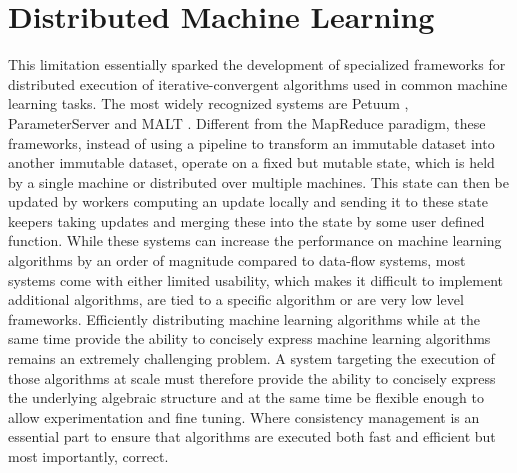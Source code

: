\section{Distributed Machine Learning}
This limitation essentially sparked the development of specialized frameworks for distributed execution of iterative-convergent algorithms used in common machine learning tasks.
The most widely recognized systems are Petuum \cite{Xing2015}, ParameterServer \cite{Li2014} and MALT \cite{Li2015}.
Different from the MapReduce paradigm, these frameworks, instead of using a pipeline to transform an immutable dataset into another immutable dataset, operate on a fixed but mutable state, which is held by a single machine or distributed over multiple machines.
This state can then be updated by workers computing an update locally and sending it to these state keepers taking updates and merging these into the state by some user defined function.
While these systems can increase the performance on machine learning algorithms by an order of magnitude \cite{Xing2015} compared to data-flow systems, most systems come with either limited usability, which makes it difficult to implement additional algorithms, are tied to a specific algorithm or are very low level frameworks.
Efficiently distributing machine learning algorithms while at the same time provide the ability to concisely express machine learning algorithms remains an extremely challenging problem.
A system targeting the execution of those algorithms at scale must therefore provide the ability to concisely express the underlying algebraic structure and at the same time be flexible enough to allow experimentation and fine tuning.
Where consistency management is an essential part to ensure that algorithms are executed both fast and efficient but most importantly, correct.


